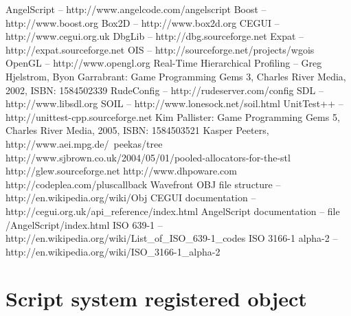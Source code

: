 \documentclass[a4paper, 12pt]{report}
\begin{document}

\begin{thebibliography}{9}
AngelScript -- http://www.angelcode.com/angelscript
Boost -- http://www.boost.org
Box2D -- http://www.box2d.org
CEGUI -- http://www.cegui.org.uk
DbgLib -- http://dbg.sourceforge.net
Expat -- http://expat.sourceforge.net
OIS -- http://sourceforge.net/projects/wgois
OpenGL -- http://www.opengl.org
Real-Time Hierarchical Profiling -- Greg Hjelstrom, Byon Garrabrant: Game Programming Gems 3, Charles River Media, 2002, ISBN: 1584502339
RudeConfig -- http://rudeserver.com/config
SDL -- http://www.libsdl.org
SOIL -- http://www.lonesock.net/soil.html
UnitTest++ -- http://unittest-cpp.sourceforge.net
Kim Pallister: Game Programming Gems 5, Charles River Media, 2005, ISBN: 1584503521
Kasper Peeters, http://www.aei.mpg.de/~peekas/tree
http://www.sjbrown.co.uk/2004/05/01/pooled-allocators-for-the-stl
http://glew.sourceforge.net
http://www.dhpoware.com
http://codeplea.com/pluscallback
Wavefront OBJ file structure -- http://en.wikipedia.org/wiki/Obj
CEGUI documentation -- http://cegui.org.uk/api\_reference/index.html
AngelScript documentation -- file /AngelScript/index.html
ISO 639-1 -- http://en.wikipedia.org/wiki/List\_of\_ISO\_639-1\_codes
ISO 3166-1 alpha-2 -- http://en.wikipedia.org/wiki/ISO\_3166-1\_alpha-2
\end{thebibliography}



\clearpage
{}
\listoffigures

\clearpage
{}
\listoftables

\appendix

\chapter{Script system registered object}


\end{document}
